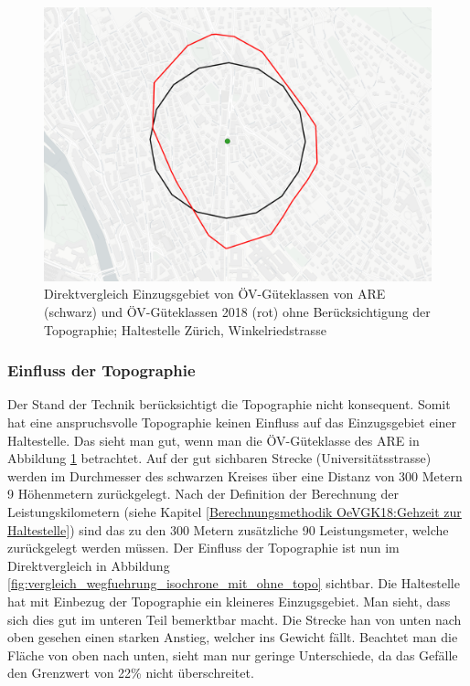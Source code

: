 \begin{figure}[ht]
    \centering
    \includegraphics[width=0.8\linewidth]{technicalreport/img/vergleich_wegfuehrung_are_isochrone}
    \caption[Direktvergleich Einzugsgebiet ARE und Isochrone]{Direktvergleich Einzugsgebiet von ÖV-Güteklassen von \ac{ARE} (schwarz) und ÖV-Güteklassen 2018 (rot) ohne Berücksichtigung der Topographie; Haltestelle Zürich, Winkelriedstrasse}
    \label{fig:vergleich_wegfuehrung_are_isochrone}
\end{figure}

\subsubsection{Einfluss der Topographie}

Der Stand der Technik berücksichtigt die Topographie nicht konsequent.
Somit hat eine anspruchsvolle Topographie keinen Einfluss auf das Einzugsgebiet einer \gls{Haltestelle}.
Das sieht man gut, wenn man die ÖV-Güteklasse des \acl{ARE} in Abbildung \ref{fig:vergleich_wegfuehrung_are_isochrone} betrachtet.
Auf der gut sichbaren Strecke (Universitätsstrasse) werden im Durchmesser des schwarzen Kreises über eine Distanz von 300 Metern 9 Höhenmetern zurückgelegt.
Nach der Definition der Berechnung der \gls{Leistungskilometer}n (siehe Kapitel \ref{Berechnungsmethodik OeVGK18:Gehzeit zur Haltestelle}) sind das zu den 300 Metern zusätzliche 90 Leistungsmeter, welche zurückgelegt werden müssen.
Der Einfluss der Topographie ist nun im Direktvergleich in Abbildung \ref{fig:vergleich_wegfuehrung_isochrone_mit_ohne_topo} sichtbar.
Die \gls{Haltestelle} hat mit Einbezug der Topographie ein kleineres Einzugsgebiet.
Man sieht, dass sich dies gut im unteren Teil bemerktbar macht.
Die Strecke han von unten nach oben gesehen einen starken Anstieg, welcher ins Gewicht fällt.
Beachtet man die Fläche von oben nach unten, sieht man nur geringe Unterschiede, da das Gefälle den Grenzwert von 22\% nicht überschreitet.

